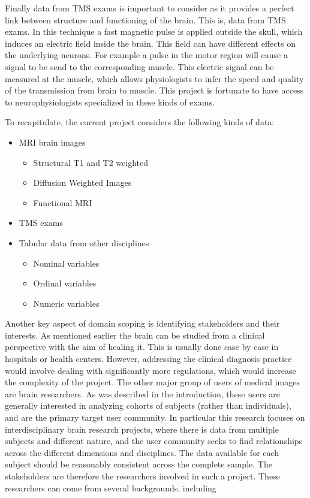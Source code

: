 Finally data from TMS exams \autocite{nollet_transcranial_2003} is important to consider as it provides a perfect link between structure and functioning of the brain. This is, data from TMS exams. In this technique a fast magnetic pulse is applied outside the skull, which induces an electric field inside the brain. This field can have different effects on the underlying neurons. For example a pulse in the motor region will cause a signal to be send to the corresponding muscle. This electric signal can be measured at the muscle, which allows physiologists to infer the speed and quality of the transmission from brain to muscle. This project is fortunate to have access to neurophysiologists specialized in these kinds of exams. 

To recapitulate, the current project considers the following kinds of data:

\begin{itemize}
\item MRI brain images
\begin{itemize}
\item Structural T1 and T2 weighted
\item Diffusion Weighted Images
\item Functional MRI
\end{itemize}
\item TMS exams
\item Tabular data from other disciplines
\begin{itemize}
\item Nominal variables
\item Ordinal variables
\item Numeric variables
\end{itemize}
\end{itemize}  

Another key aspect of domain scoping is identifying stakeholders and their interests. As mentioned earlier the brain can be studied from a clinical perspective with the aim of healing it. This is usually done case by case in hospitals or health centers. However, addressing the clinical diagnosis practice would involve dealing with significantly more regulations, which would increase the complexity of the project. The other major group of users of medical images are brain researchers. As was described in the introduction, these users are generally interested in analyzing cohorts of subjects (rather than individuals), and are the primary target user community. In particular this research focuses on interdisciplinary brain research projects, where there is data from multiple subjects and different nature, and the user community seeks to find relationships across the different dimensions and disciplines. The data available for each subject should be reasonably consistent across the complete sample. The stakeholders are therefore the researchers involved in such a project. These researchers can come from several backgrounds, including

